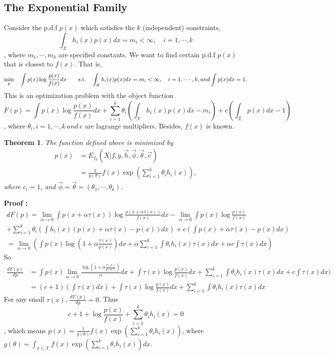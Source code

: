 \documentclass[11pt]{article}
\newtheorem{theorem}{Theorem}[section]
\begin{document}
\subsection{The Exponential Family}
Consider the p.d.f $p(x)$ which satisfies the $k$ (independent) constraints,
$$\int_{\mathcal{X}}h_{i}(x)p(x)dx=m_{i}< \infty,\quad i=1,\cdots,k$$, where $m_{1},\cdots,m_{k}$ are specified constants. We want to find certain p.d.f $p(x)$ that is closest to $f(x)$. That is,
\[
\min_{p}\quad\int p(x)\log\frac{p(x)}{f(x)}dx  ~~~~~~~\nonumber\\
\textrm{s.t.} \quad\int_{\mathcal{X}}h_{i}(x)p(x)dx=m_{i}< \infty,\quad i=1,\cdots,k, and \int p(x)dx=1.
\]
This is an optimization problem with the object function
$$F(p)=\int p(x)\log \frac{p(x)}{f(x)}dx+\sum\limits_{i=1}^{k}\theta_{i}(\int_{\mathcal{X}}h_{i}(x)p(x)dx-m_{i})+c(\int_{\mathcal{X}} p(x)dx-1)$$, where $\theta_{i}, i =1,\cdots,k~and~c$ are lagrange multipliers. Besides, $f(x)$ is known.
\begin{theorem}
The function defined above is minimized by
\[
\begin{split}
p(x) &= E_{f_{k}}(X|f,g,\vec h,\vec \phi,\vec \theta,\vec c) \\
     &= \frac{1}{g(\theta)}f(x)\exp(\sum\limits_{i=1}^{k}\theta_{i}h_{i}(x)),
\end{split}
\]
where $c_{i}=1$, and $\vec \phi=\vec \theta=(\theta_{1},\cdots,\theta_{k})$.
\end{theorem}
{\bf Proof :}
\[
\begin{split}
{dF(p)}=\lim\limits_{\alpha \to 0}\int p(x+\alpha\tau(x))\log\frac{p(x+\alpha\tau(x))}{f(x)}dx-\lim\limits_{\alpha \to 0}\int p(x)\log\frac{p(x)}{f(x)}\\+\sum\limits_{i=1}^{k}\theta_{i}(\int h_{i}(x)(p(x)+\alpha\tau(x)-p(x))dx)+c(\int p(x)+\alpha \tau(x)-p(x)dx)\\
=\lim\limits_{\alpha \to 0}(\int p(x)\log(1+\alpha\frac{\tau(x)}{p(x)})dx+\alpha\sum\limits_{i=1}^{k}\int\theta_{i}h_{i}(x)\tau(x)dx+\alpha c\int \tau(x)dx)
\end{split}
\]
So
\[
\begin{split}
\frac{dF(p)}{dp}&=\int p(x)\lim\limits_{\alpha\to0}\frac{\log(1+\alpha\frac{\tau(x)}{p(x)})}{\alpha}dx+\int \tau(x)\log \frac{p(x)}{f(x)}dx+\sum\limits_{i=1}^{k}\int\theta_{i}h_{i}(x)\tau(x)dx+c\int \tau(x)dx) \\
&=(c+1)(\int \tau(x)dx)+\int \tau(x)\log \frac{p(x)}{f(x)}dx+\sum\limits_{i=1}^{k}\int\theta_{i}h_{i}(x)\tau(x)dx
\end{split}
\]
For any small $\tau(x)$, $\frac{dF(p)}{dp}=0$. Thus $$c+1+\log \frac{p(x)}{f(x)}+\sum\limits_{i=1}^{k}\theta_{i}h_{i}(x)=0$$,
which means $p(x)=\frac{1}{g(\theta)}f(x)\exp(\sum\limits_{i=1}^{k}\theta_{i}h_{i}(x))$, where
$g(\theta)=\int_{x\in\mathcal{X}}f(x)\exp(\sum\limits_{i=1}^{k}\theta_{i}h_{i}(x))dx$.
\end{document}
